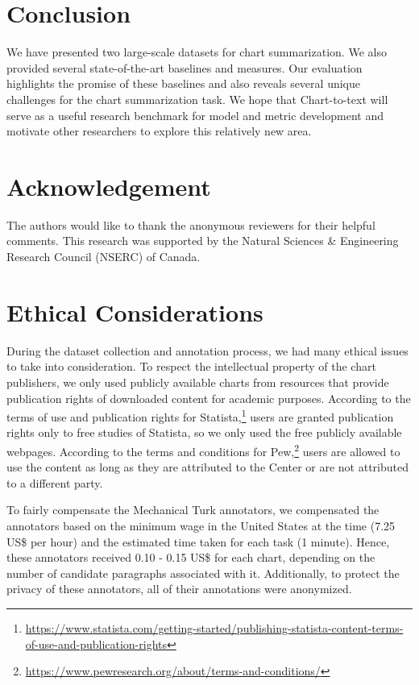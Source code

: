 \documentclass[11pt]{article}
\begin{document}
\section{Conclusion}

We have presented two large-scale datasets for chart summarization. We also provided several state-of-the-art baselines and measures. Our evaluation highlights the promise of these baselines and also reveals several unique challenges for the chart summarization task. We hope that Chart-to-text will serve as a useful research benchmark for model and metric development and motivate other researchers to explore this relatively new area. 
\section*{Acknowledgement}
The authors would like to thank the anonymous reviewers for their helpful comments. This research was supported by the Natural Sciences \& Engineering Research Council (NSERC) of Canada.
\section*{Ethical Considerations}
During the dataset collection and annotation process, we had many ethical issues to take into consideration. To respect the intellectual property of the chart publishers, we only used publicly available charts from resources that provide publication rights of downloaded content for academic purposes. According to the terms of use and publication rights for Statista,\footnote{\href{https://www.statista.com/getting-started/publishing-statista-content-terms-of-use-and-publication-rights}{https://www.statista.com/getting-started/publishing-statista-content-terms-of-use-and-publication-rights}} users are granted publication rights only to free studies of Statista, so we only used the free publicly available webpages. According to the terms and conditions for Pew,\footnote{\href{https://www.pewresearch.org/about/terms-and-conditions/}{https://www.pewresearch.org/about/terms-and-conditions/}} users are allowed to use the content as long as they are attributed to the Center or are not attributed to a different party. 

To fairly compensate the Mechanical Turk annotators, we compensated the annotators based on the minimum wage in the United States at the time (7.25 US\$ per hour) and the estimated time taken for each task (1 minute). Hence, these annotators received 0.10 - 0.15 US\$ for each chart, depending on the number of candidate paragraphs associated with it. Additionally, to protect the privacy of these annotators, all of their annotations were anonymized.
\end{document}
